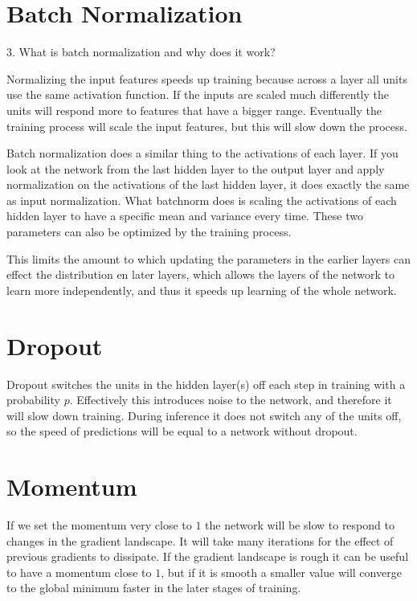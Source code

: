\documentclass[a4paper]{article}
\begin{document}
\section{Batch Normalization}
3. What is batch normalization and why does it work?

Normalizing the input features speeds up training because across a layer all units use the same activation function. If the inputs are scaled much differently the units will respond more to features that have a bigger range. Eventually the training process will scale the input features, but this will slow down the process.

Batch normalization does a similar thing to the activations of each layer. If you look at the network from the last hidden layer to the output layer and apply normalization on the activations of the last hidden layer, it does exactly the same as input normalization. What batchnorm does is scaling the activations of each hidden layer to have a specific mean and variance every time. These two parameters can also be optimized by the training process.

This limits the amount to which updating the parameters in the earlier layers can effect the distribution en later layers, which allows the layers of the network to learn more independently, and thus it speeds up learning of the whole network.

\section{Dropout}
Dropout switches the units in the hidden layer(s) off each step in training with a probability $p$. Effectively this introduces noise to the network, and therefore it will slow down training. During inference it does not switch any of the units off, so the speed of predictions will be equal to a network without dropout.

\section{Momentum}
If we set the momentum very close to $1$ the network will be slow to respond to changes in the gradient landscape. It will take many iterations for the effect of previous gradients to dissipate. If the gradient landscape is rough it can be useful to have a momentum close to $1$, but if it is smooth a smaller value will converge to the global minimum faster in the later stages of training.

{}

\end{document}
